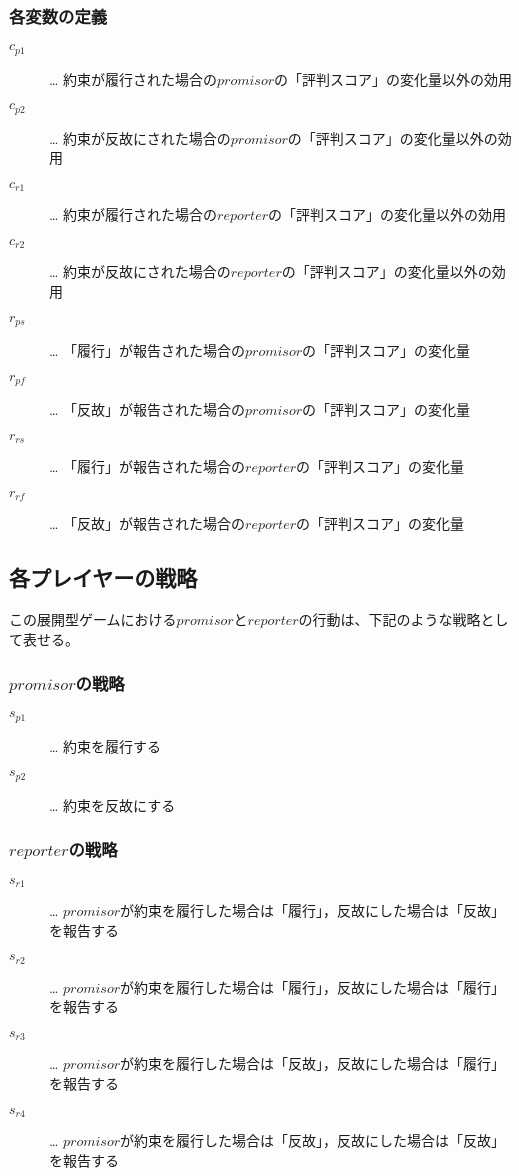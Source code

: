 \subsubsection{各変数の定義}
\label{prgamePayoffVariables}
\begin{description}
  \item[$c_{p1}$]… 約束が履行された場合の$promisor$の「評判スコア」の変化量以外の効用
  \item[$c_{p2}$]… 約束が反故にされた場合の$promisor$の「評判スコア」の変化量以外の効用
  \item[$c_{r1}$]… 約束が履行された場合の$reporter$の「評判スコア」の変化量以外の効用
  \item[$c_{r2}$]… 約束が反故にされた場合の$reporter$の「評判スコア」の変化量以外の効用
  \item[$r_{ps}$]… 「履行」が報告された場合の$promisor$の「評判スコア」の変化量
  \item[$r_{pf}$]… 「反故」が報告された場合の$promisor$の「評判スコア」の変化量
  \item[$r_{rs}$]… 「履行」が報告された場合の$reporter$の「評判スコア」の変化量
  \item[$r_{rf}$]… 「反故」が報告された場合の$reporter$の「評判スコア」の変化量
\end{description}



\subsection{各プレイヤーの戦略}
\label{playersStrategy}
この展開型ゲームにおける$promisor$と$reporter$の行動は、下記のような戦略として表せる。

\subsubsection{$promisor$の戦略}
\begin{description}
  \item[$s_{p1}$]… 約束を履行する
  \item[$s_{p2}$]… 約束を反故にする
\end{description}

\subsubsection{$reporter$の戦略}
\begin{description}
  \item[$s_{r1}$]… $promisor$が約束を履行した場合は「履行」，反故にした場合は「反故」を報告する
  \item[$s_{r2}$]… $promisor$が約束を履行した場合は「履行」，反故にした場合は「履行」を報告する
  \item[$s_{r3}$]… $promisor$が約束を履行した場合は「反故」，反故にした場合は「履行」を報告する
  \item[$s_{r4}$]… $promisor$が約束を履行した場合は「反故」，反故にした場合は「反故」を報告する
\end{description}

